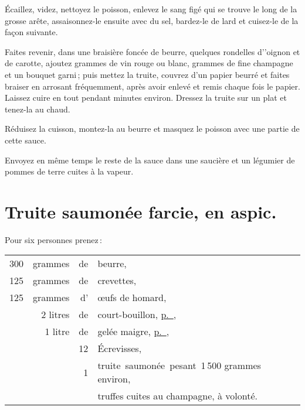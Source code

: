 Écaillez, videz, nettoyez le poisson, enlevez le sang figé qui se trouve le
long de la grosse arête, assaisonnez-le ensuite avec du sel, bardez-le de lard
et cuisez-le de la façon suivante.

Faites revenir, dans une braisière foncée de beurre, quelques rondelles
d’'oignon et de carotte, ajoutez {\mmm} grammes de vin rouge ou blanc,
{\mmm} grammes de fine champagne et un bouquet garni ; puis mettez la
truite, couvrez d'un papier beurré et faites braiser en arrosant fréquemment,
après avoir enlevé et remis chaque fois le papier. Laissez cuire en tout
pendant {\mmm} minutes environ. Dressez la truite sur un plat et tenez-la
au chaud.

Réduisez la cuisson, montez-la au beurre et masquez le poisson avec une partie
de cette sauce.

Envoyez en même temps le reste de la sauce dans une saucière et un légumier
de pommes de terre cuites à la vapeur.

\section*{\centering Truite saumonée farcie, en aspic.}

Pour six personnes prenez :

\footnotesize
\begin{longtable}{rrrp{16em}}
    300 & grammes & de & beurre,                                                                          \\
    125 & grammes & de & crevettes,                                                                       \\
    125 & grammes & d' & œufs de homard,                                                                  \\
        & 2 litres& de & court-bouillon, \hyperlink{p0323}{p. \pageref{pg0323}},                          \\
        & 1 litre & de & gelée maigre, \hyperlink{p0350}{p. \pageref{pg0350}},                            \\
        &         & 12 & Écrevisses,                                                                      \\
        &         &  1 & truite saumonée pesant 1 500 grammes environ,                                    \\
        &         &    & truffes cuites au champagne, à volonté.                                          \\
\end{longtable}
\normalsize

